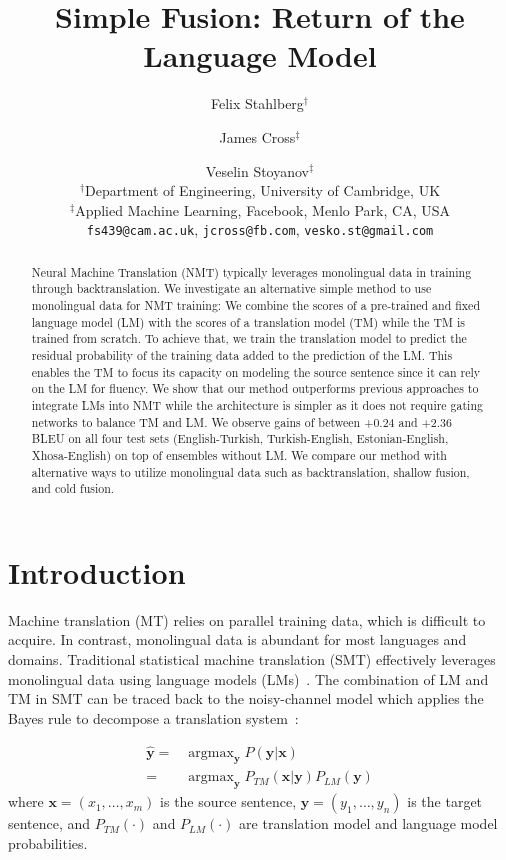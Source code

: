 \documentclass[11pt,a4paper]{article}
\title{Simple Fusion: Return of the Language Model}
\author{Felix Stahlberg$^\dag$\footnotemark \and James Cross$^{\ddagger}$ \and Veselin Stoyanov$^{\ddagger}$\\
 $^\dag$Department of Engineering, University of Cambridge, UK  \\
 $^\ddagger$Applied Machine Learning, Facebook, Menlo Park, CA, USA \\
  {\tt fs439@cam.ac.uk}, {\tt jcross@fb.com}, {\tt vesko.st@gmail.com} \\
  }
\date{}
\DeclareMathOperator*{\argmax}{argmax}
\begin{document}
\maketitle
\begin{abstract}
Neural Machine Translation (NMT) typically leverages monolingual data in training through backtranslation. We investigate an alternative simple method to use monolingual data for NMT training: We combine the scores of a pre-trained and fixed language model (LM) with the scores of a translation model (TM) while the TM is trained from scratch. To achieve that, we train the translation model to predict the residual probability of the training data added to the prediction of the LM. This enables the TM to focus its capacity on modeling the source sentence since it can rely on the LM for fluency. We show that our method outperforms previous approaches to integrate LMs into NMT while the architecture is simpler as it does not require gating networks to balance TM and LM. We observe gains of between +0.24 and +2.36 BLEU on all four test sets (English-Turkish, Turkish-English, Estonian-English, Xhosa-English) on top of ensembles without LM. We compare our method with alternative ways to utilize monolingual data such as backtranslation, shallow fusion, and cold fusion.
\end{abstract}


\section{Introduction}

Machine translation (MT) relies on parallel training data, which is difficult to acquire. In contrast, monolingual data is abundant for most languages and domains. Traditional statistical machine translation (SMT) effectively leverages monolingual data using language models (LMs)~\citep{lm-in-mt}. The combination of LM and TM in SMT can be traced back to the noisy-channel model which applies the Bayes rule to decompose a translation system~\citep{ibm}:


\begin{equation}
\begin{split}
\hat{\mathbf{y}} =& \argmax_\mathbf{y} P(\mathbf{y}|\mathbf{x}) \\
=& \argmax_\mathbf{y} P_{TM}(\mathbf{x}|\mathbf{y})P_{LM}(\mathbf{y})
\end{split}
\label{eq:noisy-channel}
\end{equation}
where $\mathbf{x}=(x_1,\dots,x_m)$ is the source sentence, $\mathbf{y}=(y_1,\dots,y_n)$ is the target sentence, and $P_{TM}(\cdot)$ and $P_{LM}(\cdot)$ are translation model and language model probabilities.
\end{document}
